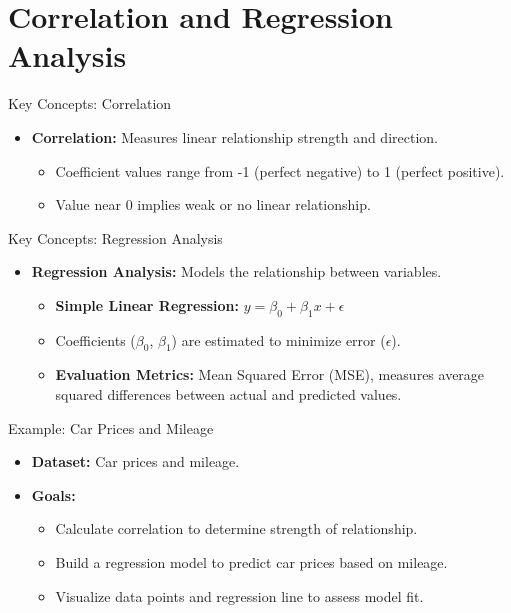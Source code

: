 \documentclass{beamer}
\begin{document}
\section{Correlation and Regression Analysis}

\begin{frame}{Key Concepts: Correlation}
\begin{itemize}
    \item \textbf{Correlation:} Measures linear relationship strength and direction.
    \begin{itemize}
        \item Coefficient values range from -1 (perfect negative) to 1 (perfect positive).
        \item Value near 0 implies weak or no linear relationship.
    \end{itemize}
\end{itemize}
\end{frame}

\begin{frame}{Key Concepts: Regression Analysis}
\begin{itemize}
    \item \textbf{Regression Analysis:} Models the relationship between variables.
    \begin{itemize}
        \item \textbf{Simple Linear Regression:} $y = \beta_0 + \beta_1 x + \epsilon$
        \item Coefficients ($\beta_0$, $\beta_1$) are estimated to minimize error ($\epsilon$).
        \item \textbf{Evaluation Metrics:} Mean Squared Error (MSE), measures average squared differences between actual and predicted values.
    \end{itemize}
\end{itemize}
\end{frame}

\begin{frame}{Example: Car Prices and Mileage}
\begin{itemize}
    \item \textbf{Dataset:} Car prices and mileage.
    \item \textbf{Goals:}
    \begin{itemize}
        \item Calculate correlation to determine strength of relationship.
        \item Build a regression model to predict car prices based on mileage.
        \item Visualize data points and regression line to assess model fit.
    \end{itemize}
\end{itemize}
\end{frame}
\end{document}
